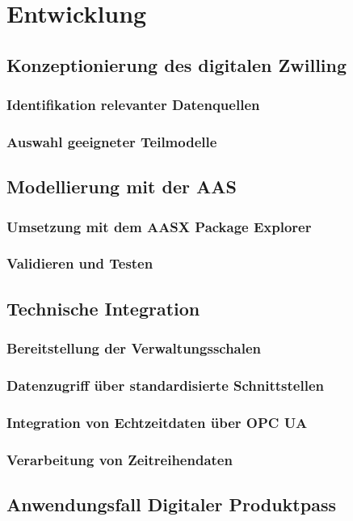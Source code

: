 \section{Entwicklung}
\subsection{Konzeptionierung des digitalen Zwilling}
\subsubsection{Identifikation relevanter Datenquellen}
\subsubsection{Auswahl geeigneter Teilmodelle}
\subsection{Modellierung mit der AAS}
\subsubsection{Umsetzung mit dem AASX Package Explorer}
\subsubsection{Validieren und Testen}
\subsection{Technische Integration}
\subsubsection{Bereitstellung der Verwaltungsschalen}
\subsubsection{Datenzugriff über standardisierte Schnittstellen}
\subsubsection{Integration von Echtzeitdaten über OPC UA}
\subsubsection{Verarbeitung von Zeitreihendaten}
\subsection{Anwendungsfall Digitaler Produktpass}
